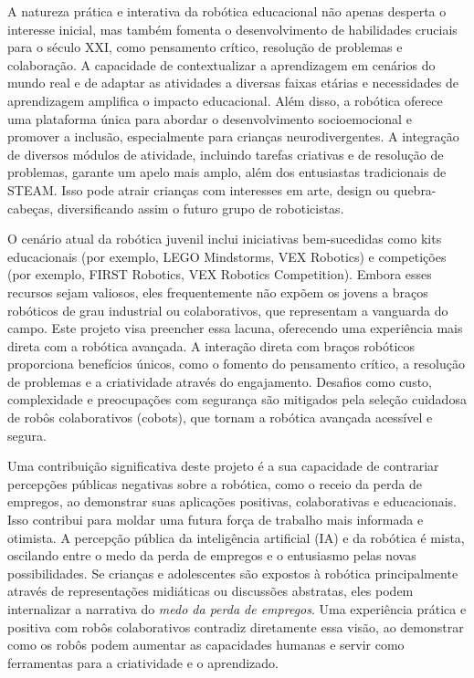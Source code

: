 \documentclass[%
  a4paper,%
  12pt,%
  fleqn,%
  english,%
  brazilian,%
]{article}
\begin{document}
A natureza prática e interativa da robótica educacional não apenas desperta o interesse inicial, mas também fomenta o desenvolvimento de habilidades cruciais para o século XXI, como pensamento crítico, resolução de problemas e colaboração. A capacidade de contextualizar a aprendizagem em cenários do mundo real e de adaptar as atividades a diversas faixas etárias e necessidades de aprendizagem amplifica o impacto educacional. Além disso, a robótica oferece uma plataforma única para abordar o desenvolvimento socioemocional e promover a inclusão, especialmente para crianças neurodivergentes. A integração de diversos módulos de atividade, incluindo tarefas criativas e de resolução de problemas, garante um apelo mais amplo, além dos entusiastas tradicionais de STEAM. Isso pode atrair crianças com interesses em arte, design ou quebra-cabeças, diversificando assim o futuro grupo de roboticistas.

O cenário atual da robótica juvenil inclui iniciativas bem-sucedidas como kits educacionais (por exemplo, LEGO Mindstorms, VEX Robotics) e competições (por exemplo, FIRST Robotics, VEX Robotics Competition). Embora esses recursos sejam valiosos, eles frequentemente não expõem os jovens a braços robóticos de grau industrial ou colaborativos, que representam a vanguarda do campo. Este projeto visa preencher essa lacuna, oferecendo uma experiência mais direta com a robótica avançada. A interação direta com braços robóticos proporciona benefícios únicos, como o fomento do pensamento crítico, a resolução de problemas e a criatividade através do engajamento. Desafios como custo, complexidade e preocupações com segurança são mitigados pela seleção cuidadosa de robôs colaborativos (cobots), que tornam a robótica avançada acessível e segura.

Uma contribuição significativa deste projeto é a sua capacidade de contrariar percepções públicas negativas sobre a robótica, como o receio da perda de empregos, ao demonstrar suas aplicações positivas, colaborativas e educacionais. Isso contribui para moldar uma futura força de trabalho mais informada e otimista. A percepção pública da inteligência artificial (IA) e da robótica é mista, oscilando entre o medo da perda de empregos e o entusiasmo pelas novas possibilidades. Se crianças e adolescentes são expostos à robótica principalmente através de representações midiáticas ou discussões abstratas, eles podem internalizar a narrativa do \emph{medo da perda de empregos}. Uma experiência prática e positiva com robôs colaborativos contradiz diretamente essa visão, ao demonstrar como os robôs podem aumentar as capacidades humanas e servir como ferramentas para a criatividade e o aprendizado.


\printbibliography%
\end{document}
